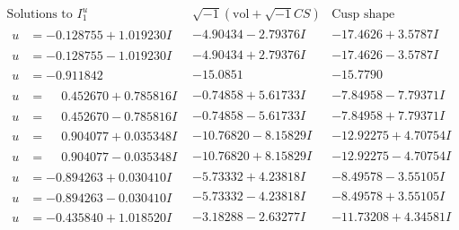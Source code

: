 \documentclass[1p]{elsarticle_modified}
\theoremstyle{definition}
\newcommand{\I}{\sqrt{-1}}
\begin{document}
$$\begin{array}{c|c|c}  
\text{Solutions to }I^u_{1}& \I (\text{vol} + \sqrt{-1}CS) & \text{Cusp shape}\\
 \hline 
\begin{aligned}
u &= -0.128755 + 1.019230 I\end{aligned}
 & -4.90434 - 2.79376 I & -17.4626 + 3.5787 I \\ \hline\begin{aligned}
u &= -0.128755 - 1.019230 I\end{aligned}
 & -4.90434 + 2.79376 I & -17.4626 - 3.5787 I \\ \hline\begin{aligned}
u &= -0.911842\phantom{ +0.000000I}\end{aligned}
 & -15.0851\phantom{ +0.000000I} & -15.7790\phantom{ +0.000000I} \\ \hline\begin{aligned}
u &= \phantom{-}0.452670 + 0.785816 I\end{aligned}
 & -0.74858 + 5.61733 I & -7.84958 - 7.79371 I \\ \hline\begin{aligned}
u &= \phantom{-}0.452670 - 0.785816 I\end{aligned}
 & -0.74858 - 5.61733 I & -7.84958 + 7.79371 I \\ \hline\begin{aligned}
u &= \phantom{-}0.904077 + 0.035348 I\end{aligned}
 & -10.76820 - 8.15829 I & -12.92275 + 4.70754 I \\ \hline\begin{aligned}
u &= \phantom{-}0.904077 - 0.035348 I\end{aligned}
 & -10.76820 + 8.15829 I & -12.92275 - 4.70754 I \\ \hline\begin{aligned}
u &= -0.894263 + 0.030410 I\end{aligned}
 & -5.73332 + 4.23818 I & -8.49578 - 3.55105 I \\ \hline\begin{aligned}
u &= -0.894263 - 0.030410 I\end{aligned}
 & -5.73332 - 4.23818 I & -8.49578 + 3.55105 I \\ \hline\begin{aligned}
u &= -0.435840 + 1.018520 I\end{aligned}
 & -3.18288 - 2.63277 I & -11.73208 + 4.34581 I \\ \hline\begin{aligned}

\end{aligned}
\end{array}$$
\end{document}
